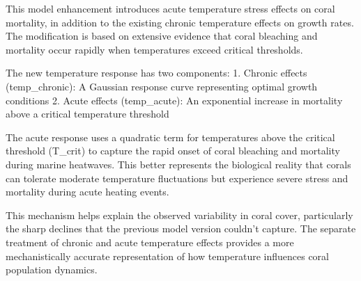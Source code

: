 This model enhancement introduces acute temperature stress effects on coral mortality, in addition to the existing chronic temperature effects on growth rates. The modification is based on extensive evidence that coral bleaching and mortality occur rapidly when temperatures exceed critical thresholds.

The new temperature response has two components:
1. Chronic effects (temp_chronic): A Gaussian response curve representing optimal growth conditions
2. Acute effects (temp_acute): An exponential increase in mortality above a critical temperature threshold

The acute response uses a quadratic term for temperatures above the critical threshold (T_crit) to capture the rapid onset of coral bleaching and mortality during marine heatwaves. This better represents the biological reality that corals can tolerate moderate temperature fluctuations but experience severe stress and mortality during acute heating events.

This mechanism helps explain the observed variability in coral cover, particularly the sharp declines that the previous model version couldn't capture. The separate treatment of chronic and acute temperature effects provides a more mechanistically accurate representation of how temperature influences coral population dynamics.
